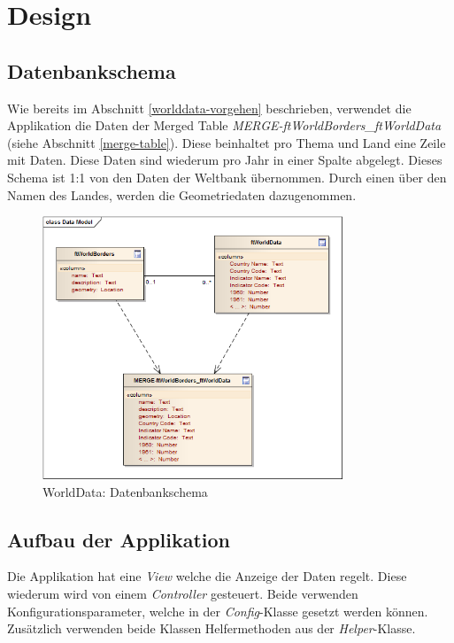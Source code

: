 \section{Design}
\subsection{Datenbankschema}
Wie bereits im Abschnitt \ref{worlddata-vorgehen} beschrieben, verwendet die Applikation die Daten der Merged Table \emph{MERGE-ftWorldBorders\_ftWorldData} (siehe Abschnitt \ref{merge-table}). Diese beinhaltet pro Thema und Land eine Zeile mit Daten. Diese Daten sind wiederum pro Jahr in einer Spalte abgelegt. Dieses Schema ist 1:1 von den Daten der Weltbank übernommen. Durch einen  über den Namen des Landes, werden die Geometriedaten dazugenommen.

\begin{figure}[H]
	\centering
	\includegraphics[width=0.8\textwidth]{images/usecase1-worlddata/uml/worlddata-datamodel}
	\caption{WorldData: Datenbankschema}
	\label{worlddata-datamodel}
\end{figure}

\subsection{Aufbau der Applikation}
Die Applikation hat eine \emph{View} welche die Anzeige der Daten regelt. Diese wiederum wird von einem \emph{Controller} gesteuert. Beide verwenden Konfigurationsparameter, welche in der \emph{Config}-Klasse gesetzt werden können. Zusätzlich verwenden beide Klassen Helfermethoden aus der \emph{Helper}-Klasse.

